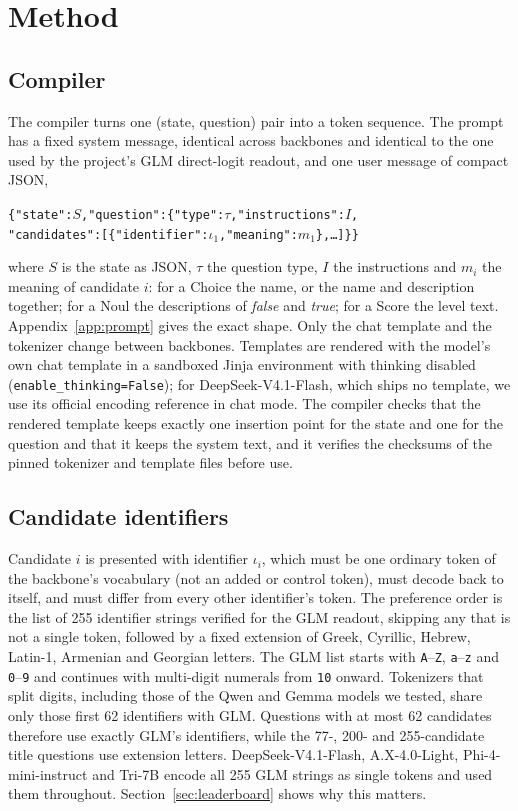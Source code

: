 \section{Method}
\label{sec:method}

\subsection{Compiler}
\label{sec:compiler}

The compiler turns one (state, question) pair into a token sequence. The prompt has a fixed
system message, identical across backbones and identical to the one used by the project's
GLM direct-logit readout, and one user message of compact JSON,
\begin{center}
\small
\texttt{\{"state":}$S$\texttt{,"question":\{"type":}$\tau$\texttt{,"instructions":}$I$\texttt{,}\\
\texttt{"candidates":[\{"identifier":}$\iota_1$\texttt{,"meaning":}$m_1$\texttt{\},\dots]\}\}}
\end{center}
where $S$ is the state as JSON, $\tau$ the question type, $I$ the instructions and $m_i$
the meaning of candidate $i$: for a Choice the name, or the name and description together;
for a Noul the descriptions of \emph{false} and \emph{true}; for a Score the level text.
Appendix~\ref{app:prompt} gives the exact shape. Only the chat template and the tokenizer
change between backbones. Templates are rendered with the model's own chat template in a
sandboxed Jinja environment with thinking disabled (\texttt{enable\_thinking=False}); for
DeepSeek-V4.1-Flash, which ships no template, we use its official encoding reference in
chat mode. The compiler checks that the rendered template keeps exactly one insertion point
for the state and one for the question and that it keeps the system text, and it verifies
the checksums of the pinned tokenizer and template files before use.

\subsection{Candidate identifiers}
\label{sec:identifiers}

Candidate $i$ is presented with identifier $\iota_i$, which must be one ordinary token of the
backbone's vocabulary (not an added or control token), must decode back to itself, and must
differ from every other identifier's token. The preference order is the list of 255
identifier strings verified for the GLM readout, skipping any that is not a single token,
followed by a fixed extension of Greek, Cyrillic, Hebrew, Latin-1, Armenian and Georgian
letters. The GLM list starts with \texttt{A}--\texttt{Z}, \texttt{a}--\texttt{z} and
\texttt{0}--\texttt{9} and continues with multi-digit numerals from \texttt{10} onward.
Tokenizers that split digits, including those of the Qwen and Gemma models we tested, share
only those first 62 identifiers with GLM. Questions with at most 62 candidates therefore use
exactly GLM's identifiers, while the 77-, 200- and 255-candidate title questions use
extension letters. DeepSeek-V4.1-Flash, A.X-4.0-Light, Phi-4-mini-instruct and Tri-7B encode
all 255 GLM strings as single tokens and used them throughout. Section~\ref{sec:leaderboard}
shows why this matters.

